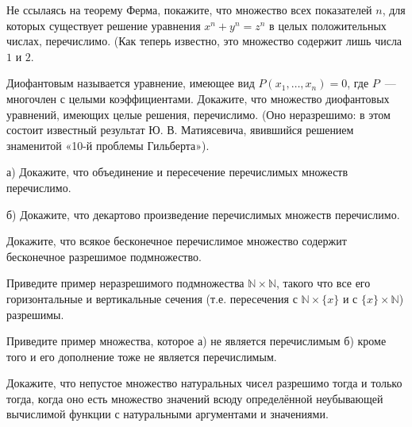 
\begin{task}
	Не ссылаясь на теорему Ферма, покажите, что множество всех показателей $n$, для которых существует решение уравнения $x^n +
    y^n = z^n$ в целых положительных числах, перечислимо. (Как теперь известно, это множество содержит лишь числа $1$ и $2$.
\end{task}


\begin{task}
    Диофантовым называется уравнение, имеющее вид $P(x_1, \dots, x_n) = 0$, где $P$~--- многочлен с целыми
    коэффициентами. Докажите, что множество диофантовых уравнений, имеющих целые решения, перечислимо. (Оно неразрешимо: в этом
    состоит известный результат Ю. В. Матиясевича, явившийся решением знаменитой «10-й проблемы Гильберта»).
\end{task}


\begin{task}
	а) Докажите, что объединение и пересечение перечислимых множеств перечислимо.

    б) Докажите, что декартово произведение перечислимых множеств перечислимо. 
\end{task}


\begin{task}
    Докажите, что всякое бесконечное перечислимое множество содержит бесконечное разрешимое подмножество.
\end{task}

\begin{task}
    Приведите пример неразрешимого подмножества $\mathbb{N} \times \mathbb{N}$, такого что все его горизонтальные и вертикальные
    сечения (т.е. пересечения с $\mathbb{N} \times \{x\} $ и с $\{x\} \times \mathbb{N}$) разрешимы.
\end{task}


\begin{task}
    Приведите пример множества, которое а) не является перечислимым б) кроме того и его дополнение тоже не является перечислимым.
\end{task}

\begin{task}
    Докажите, что непустое множество натуральных чисел разрешимо тогда и только тогда, когда оно есть множество значений всюду
    определённой неубывающей вычислимой функции с натуральными аргументами и значениями.
\end{task}